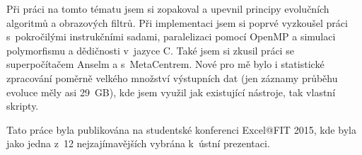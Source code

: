 Při práci na tomto tématu jsem si zopakoval a upevnil principy evolučních algoritmů a obrazových filtrů. Při implementaci jsem si poprvé vyzkoušel práci s~pokročilými instrukčními sadami, paralelizaci pomocí OpenMP a simulaci polymorfismu a dědičnosti v~jazyce C. Také jsem si zkusil práci se superpočítačem Anselm a s~MetaCentrem. Nové pro mě bylo i statistické zpracování poměrně velkého množství výstupních dat (jen záznamy průběhu evoluce měly asi 29~GB), kde jsem využil jak existující nástroje, tak vlastní skripty.

Tato práce byla publikována na studentské konferenci Excel@FIT 2015, kde byla jako jedna z~12 nejzajímavějších vybrána k~ústní prezentaci.
